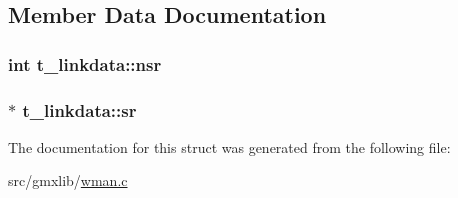 \subsection{\-Member \-Data \-Documentation}
\hypertarget{structt__linkdata_ac756879fcd23ed975a3c33bd14e1c456}{
\subsubsection[{nsr}]{\setlength{\rightskip}{0pt plus 5cm}int {\bf t\-\_\-linkdata\-::nsr}}}\label{structt__linkdata_ac756879fcd23ed975a3c33bd14e1c456}
\hypertarget{structt__linkdata_ae9f38045b6788de10e2309d8a07797b4}{
\subsubsection[{sr}]{$\ast$ {\bf t\-\_\-linkdata\-::sr}}}\label{structt__linkdata_ae9f38045b6788de10e2309d8a07797b4}


\-The documentation for this struct was generated from the following file\-:\begin{DoxyCompactItemize}
\item 
src/gmxlib/\hyperlink{wman_8c}{wman.\-c}\end{DoxyCompactItemize}
